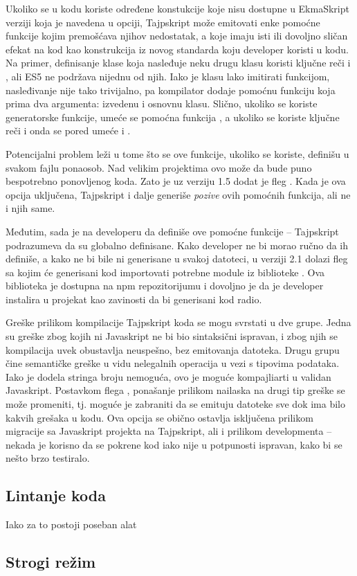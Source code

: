 Ukoliko se u kodu koriste određene konstukcije koje nisu dostupne u EkmaSkript verziji koja je navedena u  opciji, Tajpskript može emitovati enke pomoćne funkcije kojim premošćava njihov nedostatak, a koje imaju isti ili dovoljno sličan efekat na kod kao konstrukcija iz novog standarda koju developer koristi u kodu.
Na primer, definisanje klase koja nasleđuje neku drugu klasu koristi ključne reči  i , ali ES5 ne podržava nijednu od njih.
Iako je klasu lako imitirati funkcijom, nasleđivanje nije tako trivijalno, pa kompilator dodaje pomoćnu funkciju  koja prima dva argumenta: izvedenu i osnovnu klasu.
Slično, ukoliko se koriste generatorske funkcije, umeće se pomoćna funkcija , a ukoliko se koriste ključne reči  i  onda se pored  umeće i .

Potencijalni problem leži u tome što se ove funkcije, ukoliko se koriste, definišu u svakom fajlu ponaosob.
Nad velikim projektima ovo može da bude puno bespotrebno ponovljenog koda.
Zato je uz verziju 1.5 dodat je fleg .
Kada je ova opcija uključena, Tajpskript i dalje generiše \textit{pozive} ovih pomoćnih funkcija, ali ne i njih same.

Međutim, sada je na developeru da definiše ove pomoćne funkcije -- Tajpskript podrazumeva da su globalno definisane.
Kako developer ne bi morao ručno da ih definiše, a kako ne bi bile ni generisane u svakoj datoteci, u verziji 2.1 dolazi fleg  sa kojim će generisani kod importovati potrebne module iz biblioteke .
Ova biblioteka je dostupna na npm repozitorijumu i dovoljno je da je developer instalira u projekat kao zavinosti da bi generisani kod radio.

Greške prilikom kompilacije Tajpskript koda se mogu svrstati u dve grupe.
Jedna su greške zbog kojih ni Javaskript ne bi bio sintaksični ispravan, i zbog njih se kompilacija uvek obustavlja neuspešno, bez emitovanja datoteka.
Drugu grupu čine semantičke greške u vidu nelegalnih operacija u vezi s tipovima podataka.
Iako je dodela stringa broju nemoguća, ovo je moguće kompajliarti u validan Javaskript.
Postavkom flega , ponašanje prilikom nailaska na drugi tip greške se može promeniti, tj. moguće je zabraniti da se emituju  datoteke sve dok ima bilo kakvih grešaka u  kodu.
Ova opcija se obično ostavlja isključena prilikom migracije sa Javaskript projekta na Tajpskript, ali i prilikom developmenta -- nekada je korisno da se pokrene kod iako nije u potpunosti ispravan, kako bi se nešto brzo testiralo.

\subsection{Lintanje koda}

Iako za to postoji poseban alat

\subsection{Strogi režim}

